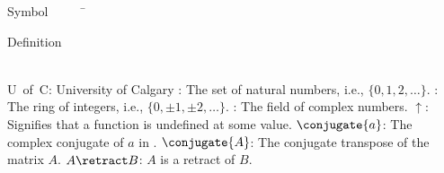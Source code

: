 


\begin{tabbing}
Symbol~~~~~\= \ \ \ \ \ \ \ \ \ \ \ \ \ \ \ \ \ \ \ \ \ \ \ \ \ \ \ \ \ \ \ \ \ \ \ \  \parbox{5in}{Definition}\\

\addsymbol \mbox{U of C}: {University of Calgary}
\addsymbol \mbox{\nat}: {The set of natural numbers, i.e., $\{0,1,2,\ldots\}$.}
\addsymbol \mbox{\integers}: {The ring of integers, i.e., $\{0,\pm1,\pm2,\ldots\}$.}
\addsymbol \mbox{\complex}: {The field of complex numbers.}
\addsymbol \mbox{$\uparrow$}: {Signifies that a function is undefined at some value.}
\addsymbol \mbox{$\conjugate{a}$}: {The complex conjugate of $a$ in \complex.}
\addsymbol \mbox{$\conjugate{A}$}: {The conjugate transpose of the matrix $A$.}
\addsymbol \mbox{$A\retract B$}: {$A$ is a retract of $B$.}
\end{tabbing}

